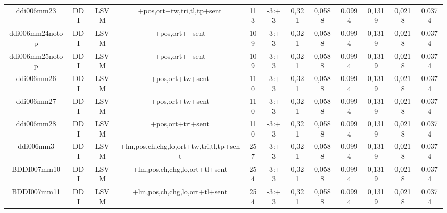 \documentclass[a4paper]{article}
\begin{document}
\begin{landscape}
\begin{center}
\begin{tabular}{ |c|c|c|c|c|c|c|c|c|c|c|c|}
 
 	
 	\small{ ddi006mm23 } & \small{ DDI} & \small{  LSVM }  & +pos,ort+tw,tri,tl,tp+sent  &  113 &  \small{  -3:+3 }  &  0,321 & 0,0588 & 0.0994  &  0,1319 & 0,0218 & 0.0374 \\
 	

 
 	
 	\small{ ddi006mm24notop } & \small{ DDI} & \small{  LSVM }  & +pos,ort++sent  &  109 &  \small{  -3:+3 }  &  0,321 & 0,0588 & 0.0994  &  0,1319 & 0,0218 & 0.0374 \\
 	

 
 	
 	\small{ ddi006mm25notop } & \small{ DDI} & \small{  LSVM }  & +pos,ort++sent  &  109 &  \small{  -3:+3 }  &  0,321 & 0,0588 & 0.0994  &  0,1319 & 0,0218 & 0.0374 \\
 	

 
 	
 	\small{ ddi006mm26 } & \small{ DDI} & \small{  LSVM }  & +pos,ort+tw+sent  &  110 &  \small{  -3:+3 }  &  0,321 & 0,0588 & 0.0994  &  0,1319 & 0,0218 & 0.0374 \\
 	

 
 	
 	\small{ ddi006mm27 } & \small{ DDI} & \small{  LSVM }  & +pos,ort+tw+sent  &  110 &  \small{  -3:+3 }  &  0,321 & 0,0588 & 0.0994  &  0,1319 & 0,0218 & 0.0374 \\
 	

 
 	
 	\small{ ddi006mm28 } & \small{ DDI} & \small{  LSVM }  & +pos,ort+tri+sent  &  110 &  \small{  -3:+3 }  &  0,321 & 0,0588 & 0.0994  &  0,1319 & 0,0218 & 0.0374 \\
 	

 
 	
 	\small{ ddi006mm3 } & \small{ DDI} & \small{  LSVM }  & +lm,pos,ch,chg,lo,ort+tw,tri,tl,tp+sent  &  257 &  \small{  -3:+3 }  &  0,321 & 0,0588 & 0.0994  &  0,1319 & 0,0218 & 0.0374 \\
 	

 
 	
 	\small{ BDDI007mm10 } & \small{ DDI} & \small{  LSVM }  & +lm,pos,ch,chg,lo,ort+tl+sent  &  254 &  \small{  -3:+3 }  &  0,321 & 0,0588 & 0.0994  &  0,1319 & 0,0218 & 0.0374 \\
 	

 
 	
 	\small{ BDDI007mm11 } & \small{ DDI} & \small{  LSVM }  & +lm,pos,ch,chg,lo,ort+tl+sent  &  254 &  \small{  -3:+3 }  &  0,321 & 0,0588 & 0.0994  &  0,1319 & 0,0218 & 0.0374 \\
 	


\end{tabular}
\end{center}
\end{landscape}
\end{document}
